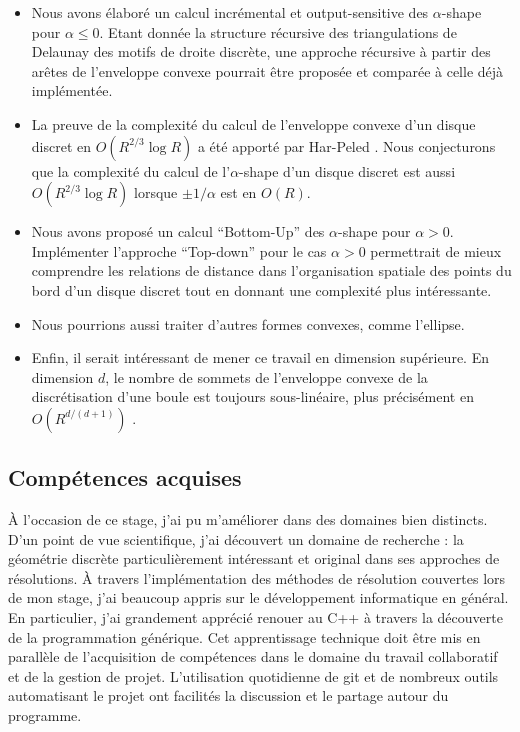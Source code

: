 \begin{itemize}
\item Nous avons élaboré un calcul incrémental et output-sensitive des $\alpha$-shape pour $\alpha \leq 0$. Etant donnée la structure récursive des triangulations de Delaunay des motifs de droite discrète, une approche récursive à partir des arêtes de l'enveloppe convexe pourrait être proposée et comparée à celle déjà implémentée. 
\item La preuve de la complexité du calcul de l'enveloppe convexe d'un disque discret en $O(R^{2/3} \log R)$ a été apporté par Har-Peled  \cite{HarPeled98}. Nous conjecturons que la complexité du calcul de l'$\alpha$-shape d'un disque discret est aussi $O(R^{2/3} \log R)$ lorsque $\pm 1 / \alpha$ est en $O(R)$. 
\item Nous avons proposé un calcul ``Bottom-Up'' des $\alpha$-shape pour $\alpha > 0$.  Implémenter l'approche ``Top-down'' pour le cas $\alpha > 0$ permettrait de mieux comprendre les relations de distance dans l'organisation spatiale des points du bord d'un disque discret tout en donnant une complexité plus intéressante. 
\item Nous pourrions aussi traiter d'autres formes convexes, comme l'ellipse.  
\item Enfin, il serait intéressant de mener ce travail en dimension supérieure. En dimension $d$, le nombre de sommets de l'enveloppe convexe de la discrétisation d'une boule est toujours sous-linéaire, plus précisément en $O(R^{d/(d+1)})$ \cite{Balog1991}.
\end{itemize}



\subsection{Compétences acquises}

À l'occasion de ce stage, j'ai pu m'améliorer dans des domaines bien distincts. D'un point de vue scientifique, j'ai découvert un domaine de recherche : la géométrie discrète particulièrement intéressant et original dans ses approches de résolutions. À travers l'implémentation des méthodes de résolution couvertes lors de mon stage, j'ai beaucoup appris sur le développement informatique en général. En particulier, j'ai grandement apprécié renouer au C++ à travers la découverte de la programmation générique. Cet apprentissage technique doit être mis en parallèle de l’acquisition de compétences dans le domaine du travail collaboratif et de la gestion de projet. L'utilisation quotidienne de git et de nombreux outils automatisant le projet ont facilités la discussion et le partage autour du programme.

